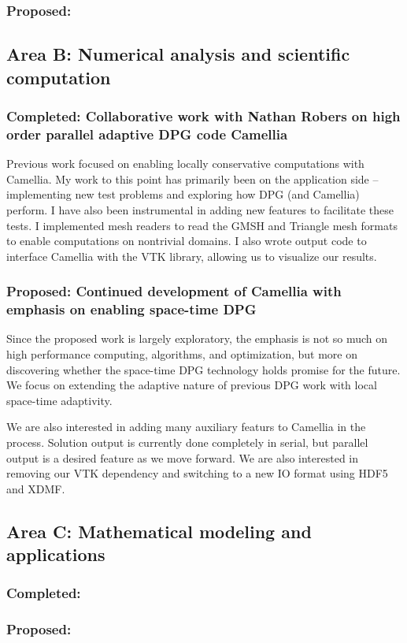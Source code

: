 \documentclass{report}
\begin{document}
\subsubsection*{Proposed:}

\subsection{Area B: Numerical analysis and scientific computation}
\subsubsection*{Completed: Collaborative work with Nathan Robers on high order parallel adaptive DPG code Camellia}
Previous work focused on enabling locally conservative computations with Camellia. My work to this point has primarily been on the application side -- implementing new test problems and exploring how DPG (and Camellia) perform. I have also been instrumental in adding new features to facilitate these tests. I implemented mesh readers to read the GMSH and Triangle mesh formats to enable computations on nontrivial domains. I also wrote output code to interface Camellia with the VTK library, allowing us to visualize our results.
 \subsubsection*{Proposed: Continued development of Camellia with emphasis on enabling space-time DPG}
Since the proposed work is largely exploratory, the emphasis is not so much on high performance computing, algorithms, and optimization, but more on discovering whether the space-time DPG technology holds promise for the future. We focus on extending the adaptive nature of previous DPG work with local space-time adaptivity.

We are also interested in adding many auxiliary featurs to Camellia in the process. Solution output is currently done completely in serial, but parallel output is a desired feature as we move forward. We are also interested in removing our VTK dependency and switching to a new IO format using HDF5 and XDMF.

\subsection{Area C: Mathematical modeling and applications}
\subsubsection*{Completed:}
\subsubsection*{Proposed:}



\end{document}
